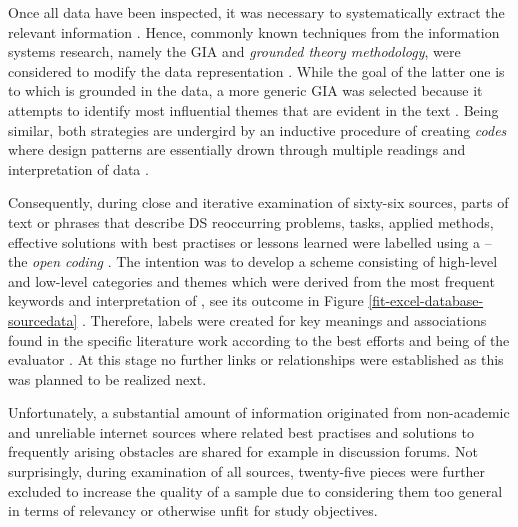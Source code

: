 Once all data have been inspected, it was necessary to systematically extract the relevant information  \parencites[29]{Okoli2010}{InventadoPeter2015}.
Hence, commonly known techniques from the information systems research, namely the \ac{GIA} and \emph{grounded theory methodology}, were considered to modify the data representation  \parencite[119]{MatavireBrown2011}.
While the goal of the latter one is to  which is grounded in the data, a more generic \ac{GIA} was selected because it attempts to identify most influential themes  that are evident in the text \parencites[241]{t06}[119]{MatavireBrown2011}.
Being similar, both strategies are undergird by an inductive procedure of creating \emph{codes} where design patterns are essentially drown  through multiple readings and interpretation of data \parencites{PasianBeverly2015}{t06}[119]{MatavireBrown2011}.

Consequently, during close and iterative examination of sixty-six sources, parts of text or phrases that describe \ac{DS} reoccurring problems, tasks, applied methods, effective solutions with best practises or lessons learned were labelled using a  -- the \emph{open coding} \parencites[238]{t06}{InventadoPeter2015}. 
The intention was to develop a scheme consisting of high-level and low-level categories and themes which were derived from the most frequent keywords and interpretation of , see its outcome in Figure \ref{fit-excel-database-sourcedata} \parencites[241]{t06}{JansenHarrie2010}{Okoli2010}{DPSummarySMS2016}. 
Therefore, labels were created for key meanings and associations found in the specific literature work according to the best efforts and being  of the evaluator \parencite[240]{t06}.
At this stage no further links or relationships were established as this was planned to be realized next.

Unfortunately, a substantial amount of information originated from non-academic and unreliable internet sources where related best practises and solutions to frequently arising obstacles are shared for example in discussion forums. 
Not surprisingly, during examination of all sources, twenty-five pieces were further excluded to increase the quality of a sample due to considering them too general in terms of relevancy or otherwise unfit for study objectives.

